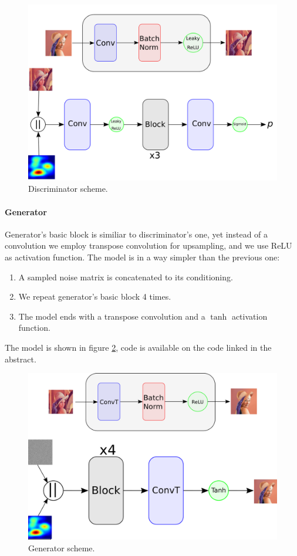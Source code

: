 \documentclass[10pt,twocolumn,letterpaper]{article}
\begin{document}
\begin{figure}[h!t]
   \centering
   \includegraphics[scale=0.25]{images/discr.png}
   \caption{Discriminator scheme.}
   \label{fig:discriminator}
\end{figure}

\paragraph{Generator}
Generator's basic block is similiar to discriminator's one, yet instead of a convolution we employ transpose convolution for upsampling, and we use ReLU as activation function.
The model is in a way simpler than the previous one:
\begin{enumerate}
   \item A sampled noise matrix is concatenated to its conditioning.
   \item We repeat generator's basic block 4 times.
   \item The model ends with a transpose convolution and a $\tanh$ activation function.
\end{enumerate}
The model is shown in figure \ref{fig:generator}, code is available on the code linked in the abstract.

\begin{figure}[h!t]
   \centering
   \includegraphics[scale=0.25]{images/gen.png}
   \caption{Generator scheme.}
   \label{fig:generator}
\end{figure}
\end{document}
